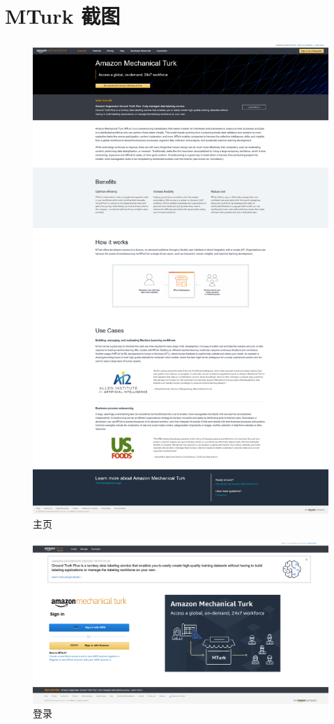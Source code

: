\section{MTurk 截图}

\begin{figure}[h!]
    \centering
    \includegraphics[width=0.7\linewidth]{imgs/home.png}
    \caption{主页}
    \label{fig:home}
\end{figure}

\newpage

\begin{figure}[h!]
    \centering
    \includegraphics[width=0.9\linewidth]{imgs/login.png}
    \caption{登录}
    \label{fig:login}
\end{figure}

